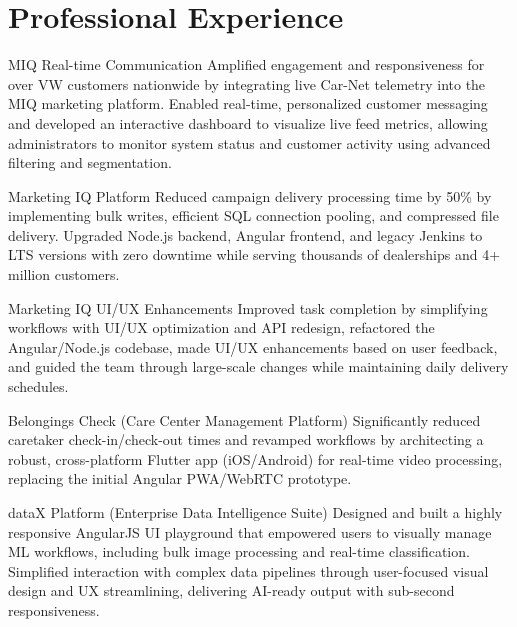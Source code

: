\section{Professional Experience}

\begin{sectionContainer}
	{MIQ Real-time Communication} {Amplified engagement and responsiveness for over VW customers nationwide by integrating live Car-Net telemetry into the MIQ marketing platform. Enabled real-time, personalized customer messaging and developed an interactive dashboard to visualize live feed metrics, allowing administrators to monitor system status and customer activity using advanced filtering and segmentation.}
\end{sectionContainer}

\begin{sectionContainer}
	{Marketing IQ Platform} {Reduced campaign delivery processing time by 50\% by implementing bulk writes, efficient SQL connection pooling, and compressed file delivery. Upgraded Node.js backend, Angular frontend, and legacy Jenkins to LTS versions with zero downtime while serving thousands of dealerships and 4+ million customers.}
\end{sectionContainer}

\begin{sectionContainer}
	{Marketing IQ UI/UX Enhancements} {Improved task completion by simplifying workflows with UI/UX optimization and API redesign, refactored the Angular/Node.js codebase, made UI/UX enhancements based on user feedback, and guided the team through large-scale changes while maintaining daily delivery schedules.}
\end{sectionContainer}


\begin{sectionContainer}
	{Belongings Check (Care Center Management Platform)} {Significantly reduced caretaker check-in/check-out times and revamped workflows by architecting a robust, cross-platform Flutter app (iOS/Android) for real-time video processing, replacing the initial Angular PWA/WebRTC prototype.}
\end{sectionContainer}

\begin{sectionContainer}
	{dataX Platform (Enterprise Data Intelligence Suite)} {Designed and built a highly responsive AngularJS UI playground that empowered users to visually manage ML workflows, including bulk image processing and real-time classification. Simplified interaction with complex data pipelines through user-focused visual design and UX streamlining, delivering AI-ready output with sub-second responsiveness.}
\end{sectionContainer}

